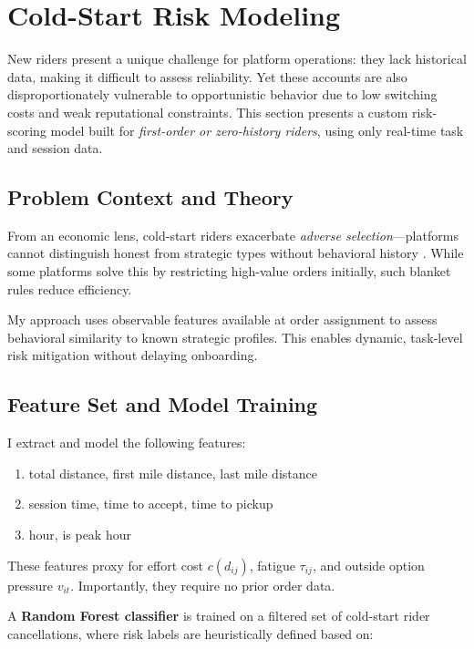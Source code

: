 \section{Cold-Start Risk Modeling}

New riders present a unique challenge for platform operations: they lack historical data, making it difficult to assess reliability. Yet these accounts are also disproportionately vulnerable to opportunistic behavior due to low switching costs and weak reputational constraints. This section presents a custom risk-scoring model built for \textit{first-order or zero-history riders}, using only real-time task and session data.

\subsection{Problem Context and Theory}

From an economic lens, cold-start riders exacerbate \textit{adverse selection}—platforms cannot distinguish honest from strategic types without behavioral history \parencite{akerlof1970lemons}. While some platforms solve this by restricting high-value orders initially, such blanket rules reduce efficiency.

My approach uses observable features available at order assignment to assess behavioral similarity to known strategic profiles. This enables dynamic, task-level risk mitigation without delaying onboarding.

\subsection{Feature Set and Model Training}

I extract and model the following features:

\begin{enumerate}
    \item total distance, first mile distance, last mile distance
    \item session time, time to accept, time to pickup
    \item hour, is peak hour
\end{enumerate}

These features proxy for effort cost $c(d_{ij})$, fatigue $\tau_{ij}$, and outside option pressure $v_{it}$. Importantly, they require no prior order data.

A \textbf{Random Forest classifier} is trained on a filtered set of cold-start rider cancellations, where risk labels are heuristically defined based on:

